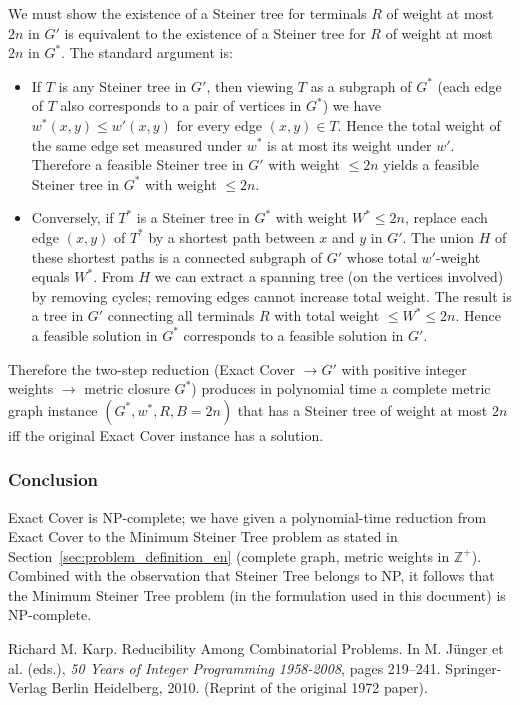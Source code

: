 \documentclass{article}
\begin{document}
We must show the existence of a Steiner tree for terminals $R$ of weight at most $2n$ in $G'$ is equivalent to the existence of a Steiner tree for $R$ of weight at most $2n$ in $G^*$. The standard argument is:

\begin{itemize}
  \item If $T$ is any Steiner tree in $G'$, then viewing $T$ as a subgraph of $G^*$ (each edge of $T$ also corresponds to a pair of vertices in $G^*$) we have $w^*(x,y)\le w'(x,y)$ for every edge $(x,y)\in T$. Hence the total weight of the same edge set measured under $w^*$ is at most its weight under $w'$. Therefore a feasible Steiner tree in $G'$ with weight $\le 2n$ yields a feasible Steiner tree in $G^*$ with weight $\le 2n$.
  \item Conversely, if $T^*$ is a Steiner tree in $G^*$ with weight $W^*\le 2n$, replace each edge $(x,y)$ of $T^*$ by a shortest path between $x$ and $y$ in $G'$. The union $H$ of these shortest paths is a connected subgraph of $G'$ whose total $w'$-weight equals $W^*$. From $H$ we can extract a spanning tree (on the vertices involved) by removing cycles; removing edges cannot increase total weight. The result is a tree in $G'$ connecting all terminals $R$ with total weight $\le W^* \le 2n$. Hence a feasible solution in $G^*$ corresponds to a feasible solution in $G'$.
\end{itemize}

Therefore the two-step reduction (Exact Cover $\to G'$ with positive integer weights $\to$ metric closure $G^*$) produces in polynomial time a complete metric graph instance $(G^*,w^*,R,B=2n)$ that has a Steiner tree of weight at most $2n$ iff the original Exact Cover instance has a solution.

\subsubsection{Conclusion}
Exact Cover is NP-complete; we have given a polynomial-time reduction from Exact Cover to the Minimum Steiner Tree problem as stated in Section~\ref{sec:problem_definition_en} (complete graph, metric weights in $\mathbb Z^+$). Combined with the observation that Steiner Tree belongs to NP, it follows that the Minimum Steiner Tree problem (in the formulation used in this document) is NP-complete.

\begin{thebibliography}{9}

Richard M. Karp.
\newblock Reducibility Among Combinatorial Problems.
\newblock In M. J{\"u}nger et al. (eds.), \emph{50 Years of Integer Programming 1958-2008}, pages 219--241. Springer-Verlag Berlin Heidelberg, 2010.
\newblock (Reprint of the original 1972 paper).

\end{thebibliography}
\end{document}
